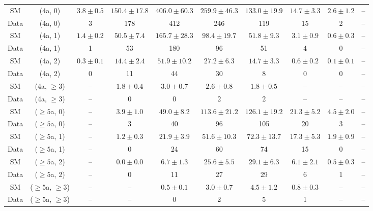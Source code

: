 \begin{table}[h!]
{\begin{tabular}{cccccccccc}
	SM & (4a, 0) & $3.8\pm 0.5$ & $150.4\pm 17.8$ & $406.0\pm 60.3$ & $259.9\pm 46.3$ & $133.0\pm 19.9$ & $14.7\pm 3.3$ & $2.6\pm 1.2$ & -- \\[0.5ex] 
	Data & (4a, 0) & 3 & 178 & 412 & 246 & 119 & 15 & 2 & -- \\[0.5ex] 
	SM & (4a, 1) & $1.4\pm 0.2$ & $50.5\pm 7.4$ & $165.7\pm 28.3$ & $98.4\pm 19.7$ & $51.8\pm 9.3$ & $3.1\pm 0.9$ & $0.6\pm 0.3$ & -- \\[0.5ex] 
	Data & (4a, 1) & 1 & 53 & 180 & 96 & 51 & 4 & 0 & -- \\[0.5ex] 
	SM & (4a, 2) & $0.3\pm 0.1$ & $14.4\pm 2.4$ & $51.9\pm 10.2$ & $27.2\pm 6.3$ & $14.7\pm 3.3$ & $0.6\pm 0.2$ & $0.1\pm 0.1$ & -- \\[0.5ex] 
	Data & (4a, 2) & 0 & 11 & 44 & 30 & 8 & 0 & 0 & -- \\[0.5ex] 
	SM & (4a, $\ge3$) & -- & $1.8\pm 0.4$ & $3.0\pm 0.7$ & $2.6\pm 0.8$ & $1.8\pm 0.5$ & -- & -- & -- \\[0.5ex] 
	Data & (4a, $\ge3$) & -- & 0 & 0 & 2 & 2 & -- & -- & -- \\[0.5ex] 
	SM & ($\ge5$a, 0) & -- & $3.9\pm 1.0$ & $49.0\pm 8.2$ & $113.6\pm 21.2$ & $126.1\pm 19.2$ & $21.3\pm 5.2$ & $4.5\pm 2.0$ & -- \\[0.5ex] 
	Data & ($\ge5$a, 0) & -- & 3 & 40 & 96 & 105 & 20 & 3 & -- \\[0.5ex] 
	SM & ($\ge5$a, 1) & -- & $1.2\pm 0.3$ & $21.9\pm 3.9$ & $51.6\pm 10.3$ & $72.3\pm 13.7$ & $17.3\pm 5.3$ & $1.9\pm 0.9$ & -- \\[0.5ex] 
	Data & ($\ge5$a, 1) & -- & 0 & 24 & 60 & 74 & 15 & 0 & -- \\[0.5ex] 
	SM & ($\ge5$a, 2) & -- & $0.0\pm 0.0$ & $6.7\pm 1.3$ & $25.6\pm 5.5$ & $29.1\pm 6.3$ & $6.1\pm 2.1$ & $0.5\pm 0.3$ & -- \\[0.5ex] 
	Data & ($\ge5$a, 2) & -- & 0 & 11 & 27 & 29 & 6 & 1 & -- \\[0.5ex] 
	SM & ($\ge5$a, $\ge3$) & -- & -- & $0.5\pm 0.1$ & $3.0\pm 0.7$ & $4.5\pm 1.2$ & $0.8\pm 0.3$ & -- & -- \\[0.5ex] 
	Data & ($\ge5$a, $\ge3$) & -- & -- & 0 & 2 & 5 & 1 & -- & -- \\[0.5ex] 
	\hline
	\hline
\end{tabular}}
\end{table}
